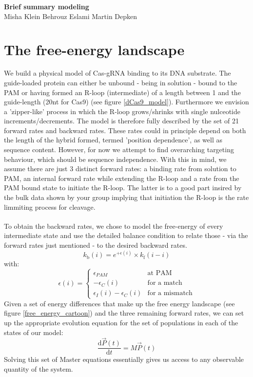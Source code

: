 \documentclass[a4paper,twoside]{revtex4-1}
\newcommand{\rate }[1]{\ensuremath{k_{\text{#1}}} }
\begin{document}
\begin{center}
{\bf \Large {Brief summary modeling}}
\vspace{10pt} \\ 
Misha Klein \quad Behrouz Eslami \quad Martin Depken  \\  
\end{center}




\section*{The free-energy landscape}
We build a physical model of Cas-gRNA binding to its DNA substrate. The guide-loaded protein can either be unbound - being in solution - bound to the PAM or having formed an R-loop (intermediate) of a length between 1 and the guide-length (20nt for Cas9) (see figure \ref{dCas9_model}). Furthermore we envision a 'zipper-like' process in which the R-loop grows/shrinks with single nulceotide increments/decrements. The model is therefore fully described by the set of 21 forward rates and backward rates. These rates could in principle depend on both the length of the hybrid formed, termed 'position dependence', as well as sequence content. However, for now we attempt to find overarching targeting behaviour, which should be sequence independence. With this in mind, we assume there are just 3 distinct forward rates: a binding rate from solution to PAM, an internal forward rate while extending the R-loop and a rate from the PAM bound state to initiate the R-loop. The latter is to a good part insired by the bulk data shown by your group implying that initiation the R-loop is the rate limmiting process for cleavage. 
\\ \\ 
To obtain the backward rates, we chose to model the free-energy of every intermediate state and use the detailed balance condition to relate those - via the forward rates just mentioned - to the desired backward rates.
\begin{equation}
	\rate{b}(i) = e^{+\epsilon(i)} \times \rate{f}(i-i)
\end{equation}
with:
\begin{equation}
	\epsilon(i) = \begin{cases}
	\epsilon_{PAM} & \text{at PAM} \\
	-\epsilon_C(i) & \text{for a match} \\
	\epsilon_I(i) - \epsilon_C(i)  & \text{for a mismatch}
	\end{cases}  
\end{equation}
Given a set of energy differences that make up the  free energy landscape (see figure \ref{free_energy_cartoon}) and the three remaining forward rates, we can set up the appropriate evolution equation for the set of populations in each of the states of our model:
\begin{equation}
	\frac{\mathrm{d} \vec{P}(t)}{\mathrm{d}t} = M \vec{P}(t)
\end{equation}
Solving this set of Master equations essentially gives us access to any observable quantity of the system. 
\end{document}

